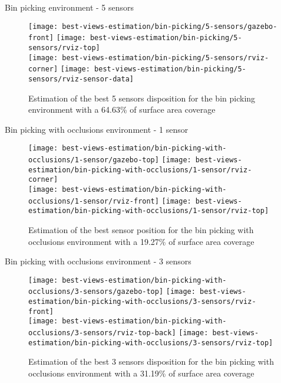 \begin{frame}{Bin picking environment - 5 sensors}
	\begin{figure}
		\centering
		\texttt{[image: best-views-estimation/bin-picking/5-sensors/gazebo-front]}\hspace{2em}
		\texttt{[image: best-views-estimation/bin-picking/5-sensors/rviz-top]}\\
		\texttt{[image: best-views-estimation/bin-picking/5-sensors/rviz-corner]}\hspace{2em}
		\texttt{[image: best-views-estimation/bin-picking/5-sensors/rviz-sensor-data]}
		\caption{Estimation of the best 5 sensors disposition for the bin picking environment with a 64.63\% of surface area coverage}
	\end{figure}
\end{frame}


\begin{frame}{Bin picking with occlusions environment - 1 sensor}
	\begin{figure}
		\centering
		\texttt{[image: best-views-estimation/bin-picking-with-occlusions/1-sensor/gazebo-top]}\hspace{2em}
		\texttt{[image: best-views-estimation/bin-picking-with-occlusions/1-sensor/rviz-corner]}\\
		\texttt{[image: best-views-estimation/bin-picking-with-occlusions/1-sensor/rviz-front]}\hspace{4em}
		\texttt{[image: best-views-estimation/bin-picking-with-occlusions/1-sensor/rviz-top]}
		\caption{Estimation of the best sensor position for the bin picking with occlusions environment with a 19.27\% of surface area coverage}
	\end{figure}
\end{frame}


\begin{frame}{Bin picking with occlusions environment - 3 sensors}
	\begin{figure}
		\centering
		\texttt{[image: best-views-estimation/bin-picking-with-occlusions/3-sensors/gazebo-top]}\hspace{2em}
		\texttt{[image: best-views-estimation/bin-picking-with-occlusions/3-sensors/rviz-front]}\\
		\texttt{[image: best-views-estimation/bin-picking-with-occlusions/3-sensors/rviz-top-back]}\hspace{4em}
		\texttt{[image: best-views-estimation/bin-picking-with-occlusions/3-sensors/rviz-top]}
		\caption{Estimation of the best 3 sensors disposition for the bin picking with occlusions environment with a 31.19\% of surface area coverage}
	\end{figure}
\end{frame}


